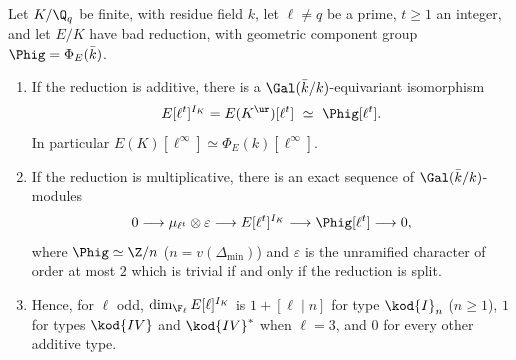 \begin{proposition}\label{prop:reduction:component-invariants}
Let $K/\Q_q$ be finite, with residue field $k$, let $\ell\ne q$ be a prime, $t\ge1$ an integer, and let $E/K$ have bad
reduction, with geometric component group $\Phig=\Phi_E(\bar k)$.
\begin{enumerate}[label=(\roman*)]
\item If the reduction is additive, there is a $\Gal(\bar k/k)$-equivariant isomorphism
\[
E[\ell^t]^{I_K}=E(K^{\ur})[\ell^t]\ \simeq\ \Phig[\ell^t].
\]
In particular $E(K)[\ell^\infty]\simeq\Phi_E(k)[\ell^\infty]$.
\item If the reduction is multiplicative, there is an exact sequence of $\Gal(\bar k/k)$-modules
\[
0\longrightarrow\mu_{\ell^t}\otimes\varepsilon\longrightarrow E[\ell^t]^{I_K}\longrightarrow\Phig[\ell^t]\longrightarrow0,
\]
where $\Phig\simeq\Z/n$ ($n=v(\Delta_{\min})$) and $\varepsilon$ is the unramified character of order at most $2$
which is trivial if and only if the reduction is split.
\item Hence, for $\ell$ odd, $\dim_{\F_\ell}E[\ell]^{I_K}$ is $1+[\ell\mid n]$ for type $\kod{I}_n$ ($n\ge1$), $1$ for
types $\kod{IV}$ and $\kod{IV}^*$ when $\ell=3$, and $0$ for every other additive type.
\end{enumerate}
\end{proposition}

